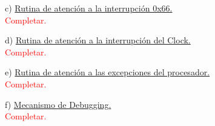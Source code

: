 \documentclass[a4paper]{article}
\begin{document}
{\large c)} \underline{Rutina de atenci\'on a la interrupci\'on 0x66.}\\


\textcolor{red}{Completar.}\\
\bigskip

{\large d)} \underline{Rutina de atenci\'on a la interrupci\'on del Clock.}\\

\textcolor{red}{Completar.}\\
\bigskip

{\large e)} \underline{Rutina de atenci\'on a las excepciones del procesador.}\\


\textcolor{red}{Completar.}\\
\bigskip

{\large f)} \underline{Mecanismo de Debugging.}\\


\textcolor{red}{Completar.}\\
\end{document}
